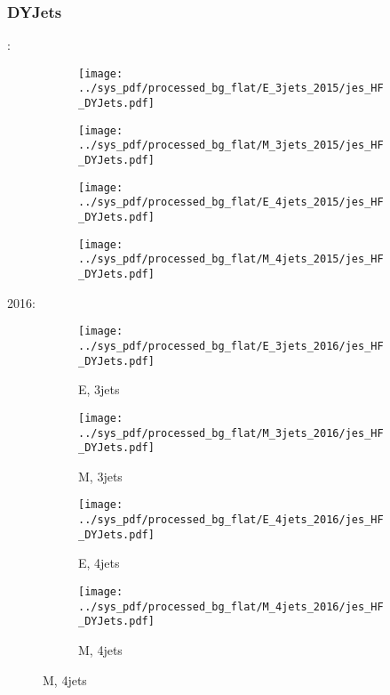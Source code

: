 \documentclass{beamer}
\begin{document}
\begin{frame}
\frametitle{DYJets}
\fontsize{5}{1}:
\begin{figure}
\centering
\begin{subfigure}[b]{0.24\textwidth}
\texttt{[image: ../sys\_pdf/processed\_bg\_flat/E\_3jets\_2015/jes\_HF\_DYJets.pdf]}
\end{subfigure}
\begin{subfigure}[b]{0.24\textwidth}
\texttt{[image: ../sys\_pdf/processed\_bg\_flat/M\_3jets\_2015/jes\_HF\_DYJets.pdf]}
\end{subfigure}
\begin{subfigure}[b]{0.24\textwidth}
\texttt{[image: ../sys\_pdf/processed\_bg\_flat/E\_4jets\_2015/jes\_HF\_DYJets.pdf]}
\end{subfigure}
\begin{subfigure}[b]{0.24\textwidth}
\texttt{[image: ../sys\_pdf/processed\_bg\_flat/M\_4jets\_2015/jes\_HF\_DYJets.pdf]}
\end{subfigure}
\end{figure}
2016:
\begin{figure}
\centering
\begin{subfigure}[b]{0.24\textwidth}
\texttt{[image: ../sys\_pdf/processed\_bg\_flat/E\_3jets\_2016/jes\_HF\_DYJets.pdf]}
\captionsetup{font=tiny}
\caption{E, 3jets}
\end{subfigure}
\begin{subfigure}[b]{0.24\textwidth}
\texttt{[image: ../sys\_pdf/processed\_bg\_flat/M\_3jets\_2016/jes\_HF\_DYJets.pdf]}
\captionsetup{font=tiny}
\caption{M, 3jets}
\end{subfigure}
\begin{subfigure}[b]{0.24\textwidth}
\texttt{[image: ../sys\_pdf/processed\_bg\_flat/E\_4jets\_2016/jes\_HF\_DYJets.pdf]}
\captionsetup{font=tiny}
\caption{E, 4jets}
\end{subfigure}
\begin{subfigure}[b]{0.24\textwidth}
\texttt{[image: ../sys\_pdf/processed\_bg\_flat/M\_4jets\_2016/jes\_HF\_DYJets.pdf]}
\captionsetup{font=tiny}
\caption{M, 4jets}
\end{subfigure}
\end{figure}
\end{frame}
\end{document}
